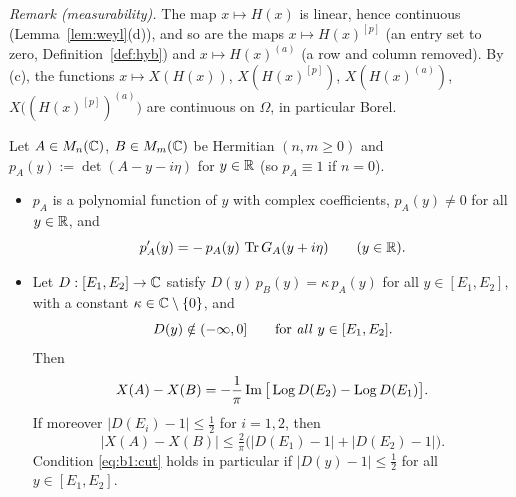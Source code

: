 \noindent\emph{Remark (measurability).} The map $x\mapsto H(x)$ is linear, hence continuous (Lemma~\ref{lem:weyl}(d)), and so are the maps
$x\mapsto H(x)^{[p]}$ (an entry set to zero, Definition~\ref{def:hyb}) and $x\mapsto H(x)^{(a)}$ (a row and column removed).
By (c), the functions $x\mapsto X(H(x))$, $X(H(x)^{[p]})$, $X(H(x)^{(a)})$, $X\big((H(x)^{[p]})^{(a)}\big)$ are continuous on $\Omega$, in particular Borel.

\begin{lemma}\label{lem:ratio}\infra{}
Let $A\in M_n(\mathbb{C})$, $B\in M_m(\mathbb{C})$ be Hermitian $(n,m\ge0)$ and $p_A(y):=\det(A-y-i\eta)$ for $y\in\mathbb{R}$ (so $p_A\equiv1$ if $n=0$).
\begin{itemize}\itemsep0pt
\item[\textup{(i)}] $p_A$ is a polynomial function of $y$ with complex coefficients, $p_A(y)\ne0$ for all $y\in\mathbb{R}$, and
\[
p_A'(y)=-\,p_A(y)\,\operatorname{Tr} G_A(y+i\eta)\qquad(y\in\mathbb{R}).
\]
\item[\textup{(ii)}] Let $D:[E_1,E_2]\to\mathbb{C}$ satisfy $D(y)\,p_B(y)=\kappa\,p_A(y)$ for all $y\in[E_1,E_2]$, with a constant $\kappa\in\mathbb{C}\setminus\{0\}$, and
\begin{equation}\label{eq:b1:cut}
D(y)\notin(-\infty,0]\qquad\text{for \emph{all} }y\in[E_1,E_2].
\end{equation}
Then
\begin{equation}\label{eq:b1:ratio}
X(A)-X(B)=-\frac1\pi\operatorname{Im}\big[\operatorname{Log} D(E_2)-\operatorname{Log} D(E_1)\big].
\end{equation}
If moreover $|D(E_i)-1|\le\frac12$ for $i=1,2$, then
\begin{equation}\label{eq:b1:ratiobd}
|X(A)-X(B)|\le\tfrac2\pi\big(|D(E_1)-1|+|D(E_2)-1|\big).
\end{equation}
Condition \eqref{eq:b1:cut} holds in particular if $|D(y)-1|\le\frac12$ for all $y\in[E_1,E_2]$.
\end{itemize}
\end{lemma}
